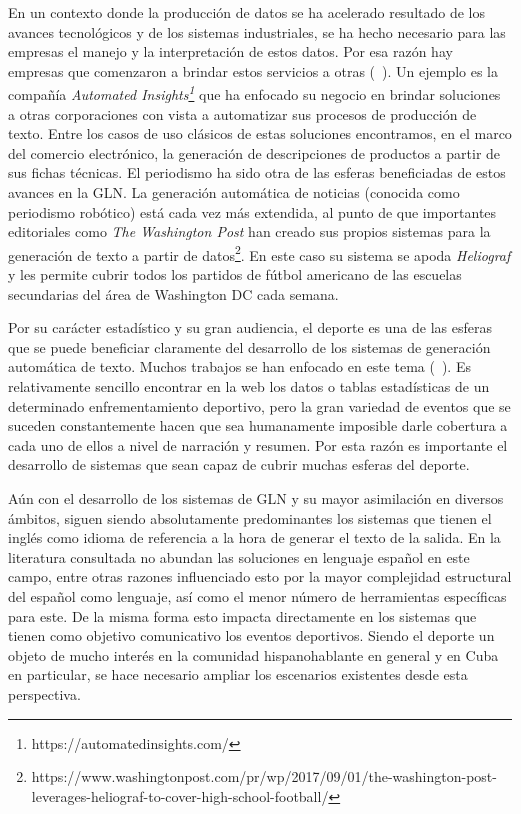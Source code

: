     En un contexto donde la producción de datos se ha acelerado resultado de los avances tecnológicos y de los sistemas industriales, se ha hecho necesario para 
las empresas el manejo y la interpretación de estos datos. Por esa raz\'on hay empresas que comenzaron a brindar estos servicios a otras (~\cite{dale2020natural}). Un ejemplo es la compañía 
\textit{Automated Insights\footnote[1]{https://automatedinsights.com/}} que ha enfocado su negocio en brindar soluciones a otras corporaciones con vista a automatizar sus 
procesos de producción de texto. Entre los casos de uso clásicos de estas soluciones encontramos, en el marco del comercio electr\'onico, la generación de descripciones de 
productos a partir de sus fichas técnicas. El periodismo ha sido otra de las esferas beneficiadas de estos avances en la GLN. La generación automática de noticias (conocida como 
periodismo robótico) está cada vez más extendida, al punto de que importantes editoriales como \textit{The Washington Post} han creado sus propios sistemas para la generación de 
texto a partir de datos\footnote[2]{https://www.washingtonpost.com/pr/wp/2017/09/01/the-washington-post-leverages-heliograf-to-cover-high-school-football/}. 
En este caso su sistema se apoda \textit{Heliograf} y les permite cubrir todos los partidos de fútbol americano de las escuelas secundarias del área de Washington DC 
cada semana.

    Por su carácter estadístico y su gran audiencia, el deporte es una de las esferas que se puede beneficiar claramente del desarrollo de los sistemas 
de generación automática de texto. Muchos trabajos se han enfocado en este tema (~\cite{theune2001data, van2017pass, gunasiri2021automated,}).  Es relativamente sencillo encontrar en la web 
los datos o tablas estadísticas de un determinado enfrementamiento deportivo, pero la gran variedad de eventos que se suceden constantemente hacen 
que sea humanamente imposible darle cobertura a cada uno de ellos a nivel de narración y resumen. Por esta razón es importante el desarrollo 
de sistemas que sean capaz de cubrir muchas esferas del deporte.



    Aún con el desarrollo de los sistemas de GLN y su mayor asimilación en diversos ámbitos, siguen siendo absolutamente predominantes los 
sistemas que tienen el inglés como idioma de referencia a la hora de generar el texto de la salida. En la literatura consultada no abundan las soluciones 
en lenguaje español en este campo, entre otras razones influenciado esto por la mayor complejidad estructural del español como lenguaje, así como el menor número 
de herramientas específicas para este. De la misma forma esto impacta directamente en los sistemas que tienen como objetivo comunicativo los eventos deportivos. Siendo el deporte un objeto de mucho interés en la 
comunidad hispanohablante en general y en Cuba en particular, se hace necesario ampliar los escenarios existentes desde esta perspectiva.

